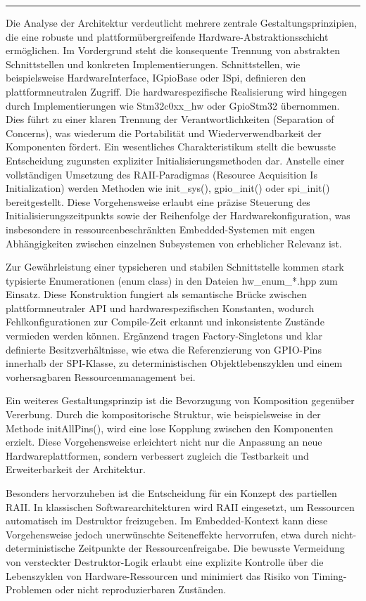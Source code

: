 \vspace{0.5em}
\noindent\rule{\linewidth}{0.4pt}
\vspace{0.5em}

Die Analyse der Architektur verdeutlicht mehrere zentrale Gestaltungsprinzipien, die eine robuste und plattformübergreifende Hardware-Abstraktionsschicht ermöglichen. 
Im Vordergrund steht die konsequente Trennung von abstrakten Schnittstellen und konkreten Implementierungen. 
Schnittstellen, wie beispielsweise HardwareInterface, IGpioBase oder ISpi, definieren den plattformneutralen Zugriff. 
Die hardwarespezifische Realisierung wird hingegen durch Implementierungen wie Stm32c0xx\_hw oder GpioStm32 übernommen.
Dies führt zu einer klaren Trennung der Verantwortlichkeiten (Separation of Concerns), was wiederum die Portabilität und Wiederverwendbarkeit der Komponenten fördert.
Ein wesentliches Charakteristikum stellt die bewusste Entscheidung zugunsten expliziter Initialisierungsmethoden dar. 
Anstelle einer vollständigen Umsetzung des RAII-Paradigmas (Resource Acquisition Is Initialization) werden Methoden wie init\_sys(), gpio\_init() oder spi\_init() bereitgestellt. 
Diese Vorgehensweise erlaubt eine präzise Steuerung des Initialisierungszeitpunkts sowie der Reihenfolge der Hardwarekonfiguration, was insbesondere in ressourcenbeschränkten Embedded-Systemen mit engen Abhängigkeiten zwischen einzelnen Subsystemen von erheblicher Relevanz ist.

Zur Gewährleistung einer typsicheren und stabilen Schnittstelle kommen stark typisierte Enumerationen (enum class) in den Dateien hw\_enum\_*.hpp zum Einsatz. 
Diese Konstruktion fungiert als semantische Brücke zwischen plattformneutraler API und hardwarespezifischen Konstanten, wodurch Fehlkonfigurationen zur Compile-Zeit erkannt und inkonsistente Zustände vermieden werden können. 
Ergänzend tragen Factory-Singletons und klar definierte Besitzverhältnisse, wie etwa die Referenzierung von GPIO-Pins innerhalb der SPI-Klasse, zu deterministischen Objektlebenszyklen und einem vorhersagbaren Ressourcenmanagement bei.

Ein weiteres Gestaltungsprinzip ist die Bevorzugung von Komposition gegenüber Vererbung. 
Durch die kompositorische Struktur, wie beispielsweise in der Methode initAllPins(), wird eine lose Kopplung zwischen den Komponenten erzielt. 
Diese Vorgehensweise erleichtert nicht nur die Anpassung an neue Hardwareplattformen, sondern verbessert zugleich die Testbarkeit und Erweiterbarkeit der Architektur.

Besonders hervorzuheben ist die Entscheidung für ein Konzept des partiellen RAII. 
In klassischen Softwarearchitekturen wird RAII eingesetzt, um Ressourcen automatisch im Destruktor freizugeben. 
Im Embedded-Kontext kann diese Vorgehensweise jedoch unerwünschte Seiteneffekte hervorrufen, etwa durch nicht-deterministische Zeitpunkte der Ressourcenfreigabe. 
Die bewusste Vermeidung von versteckter Destruktor-Logik erlaubt eine explizite Kontrolle über die Lebenszyklen von Hardware-Ressourcen und minimiert das Risiko von Timing-Problemen oder nicht reproduzierbaren Zuständen.

